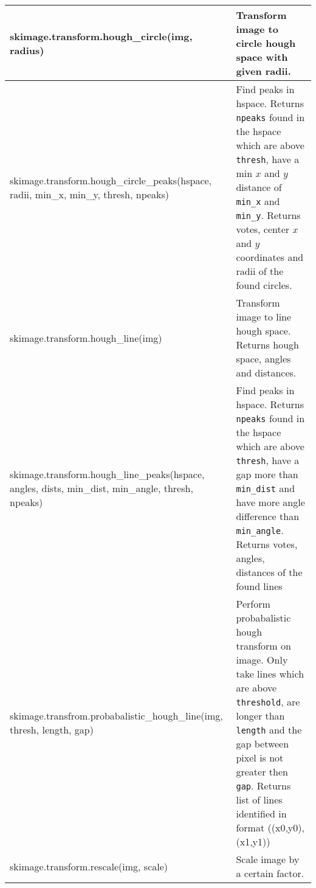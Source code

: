 \begin{tabularx}{\textwidth}{t{8cm} X}
    skimage.transform.hough\_circle(img, radius)                                                       & Transform image to circle hough space with given radii.                                                                                                                                          \\\hline
    skimage.transform.hough\_circle\_peaks(hspace, radii, min\_x, min\_y, thresh, npeaks)              & Find peaks in hspace. Returns \texttt{npeaks} found in the hspace which are above \texttt{thresh}, have a min $x$ and $y$ distance of \texttt{min\_x} and \texttt{min\_y}.
    Returns votes, center $x$ and $y$ coordinates  and radii of the found circles.                                                                                                                                                                                                                        \\\hline
    skimage.transform.hough\_line(img)                                                                 & Transform image to line hough space. Returns hough space, angles and distances.                                                                                                                  \\\hline
    skimage.transform.hough\_line\_peaks(hspace, angles, dists, min\_dist, min\_angle, thresh, npeaks) & Find peaks in hspace. Returns \texttt{npeaks} found in the hspace which are above \texttt{thresh},
    have a gap more than \texttt{min\_dist} and have more angle difference than \texttt{min\_angle}. Returns votes, angles, distances of the found lines                                                                                                                                                  \\\hline
    skimage.transfrom.probabalistic\_hough\_line(\newline img, thresh, length, gap)                    & Perform probabalistic hough transform on image.
    Only take lines which are above \texttt{threshold}, are longer than \texttt{length} and the gap between pixel is not greater then \texttt{gap}. Returns list of lines identified in format ((x0,y0),(x1,y1))                                                                                          \\\hline
    skimage.transform.rescale(img, scale)                                                              & Scale image by a certain factor.                                                                                                                                                                 \\\hline
\end{tabularx}

